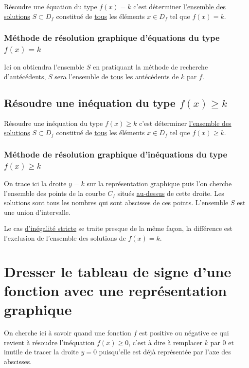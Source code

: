 \documentclass[french]{book}
\begin{document}
Résoudre une équation du type $f(x)=k$ c'est déterminer \underline{l'ensemble des solutions} $S\subset D_f$ constitué de \underline{tous} les éléments $x\in D_f$ tel que $f(x)=k$.

\subsubsection{Méthode de résolution graphique d'équations du type $f(x)=k$}
Ici on obtiendra l'ensemble $S$ en pratiquant la méthode de recherche d'antécédents, $S$ sera l'ensemble de  \underline{tous} les antécédents de $k$ par $f$.

\subsection{Résoudre une inéquation du type $f(x)\geq k$}
Résoudre une inéquation du type $f(x) \geq k$ c'est déterminer \underline{l'ensemble des solutions} $S\subset D_f$ constitué de \underline{tous} les éléments $x\in D_f$ tel que $f(x)\geq k$.
\subsubsection{Méthode de résolution graphique d'inéquations du type $f(x)\geq k$}
On trace ici la droite $y=k$ sur la représentation graphique puis l'on cherche l'ensemble des points de la courbe $C_f$ situés \underline{au-dessus} de cette droite. Les solutions sont tous les nombres qui sont abscisses de ces points. L'ensemble $S$ est une union d'intervalle.

Le cas \underline{d'inégalité stricte} se traite presque de la même façon, la différence est l'exclusion  de l'ensemble des solutions de $f(x)=k$.


\section{Dresser le tableau de signe d'une fonction avec une représentation graphique}
On cherche ici à savoir quand une fonction $f$ est positive ou négative ce qui revient à résoudre l'inéquation $f(x) \geq 0$, c'est à dire à remplacer $k$ par 0 et inutile de tracer la droite $y=0$ puisqu'elle est déjà représentée par l'axe des abscisses.
\end{document}
